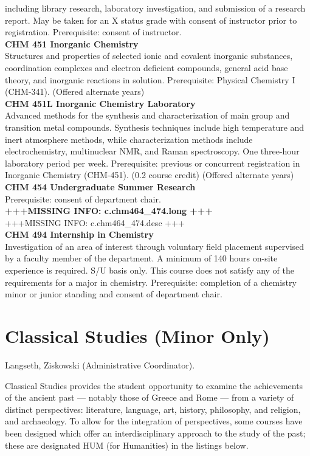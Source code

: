 \documentclass[
  letterpaper,
]{scrbook}
\begin{document}
including library research, laboratory investigation, and submission of
a research report. May be taken for an X status grade with consent of
instructor prior to registration. Prerequisite: consent of instructor.\\
\textbf{CHM 451 Inorganic Chemistry}\\
Structures and properties of selected ionic and covalent inorganic
substances, coordination complexes and electron deficient compounds,
general acid base theory, and inorganic reactions in solution.
Prerequisite: Physical Chemistry I (CHM-341). (Offered alternate
years)\\
\textbf{CHM 451L Inorganic Chemistry Laboratory}\\
Advanced methods for the synthesis and characterization of main group
and transition metal compounds. Synthesis techniques include high
temperature and inert atmosphere methods, while characterization methods
include electrochemistry, multinuclear NMR, and Raman spectroscopy. One
three-hour laboratory period per week. Prerequisite: previous or
concurrent registration in Inorganic Chemistry (CHM-451). (0.2 course
credit) (Offered alternate years)\\
\textbf{CHM 454 Undergraduate Summer Research}\\
Prerequisite: consent of department chair.\\
\textbf{+++MISSING INFO: c.chm464\_474.long +++}\\
+++MISSING INFO: c.chm464\_474.desc +++\\
\textbf{CHM 494 Internship in Chemistry}\\
Investigation of an area of interest through voluntary field placement
supervised by a faculty member of the department. A minimum of 140 hours
on-site experience is required. S/U basis only. This course does not
satisfy any of the requirements for a major in chemistry. Prerequisite:
completion of a chemistry minor or junior standing and consent of
department chair.

\section{Classical Studies (Minor
Only)}\label{classical-studies-minor-only}

Langseth, Ziskowski (Administrative Coordinator).

Classical Studies provides the student opportunity to examine the
achievements of the ancient past --- notably those of Greece and Rome
--- from a variety of distinct perspectives: literature, language, art,
history, philosophy, and religion, and archaeology. To allow for the
integration of perspectives, some courses have been designed which offer
an interdisciplinary approach to the study of the past; these are
designated HUM (for Humanities) in the listings below.
\end{document}

